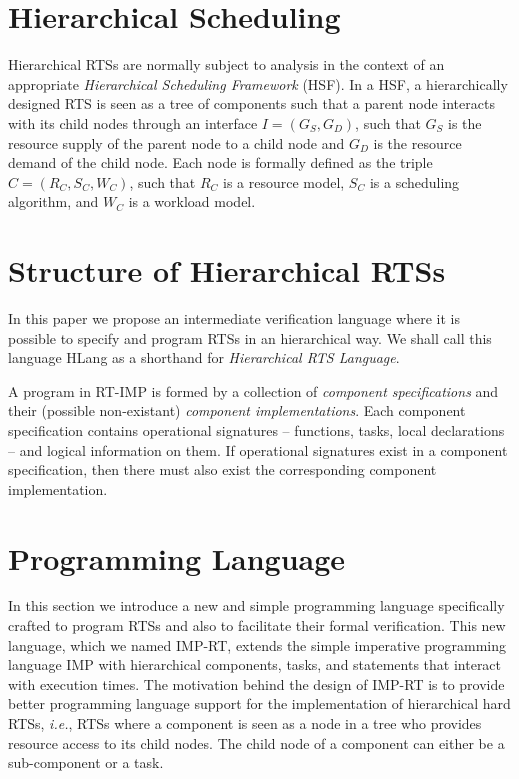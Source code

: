 \documentclass{llncs}
\begin{document}
\section{Hierarchical Scheduling}

Hierarchical RTSs are normally subject to analysis in the context of an appropriate {\em Hierarchical Scheduling Framework} (HSF). In a HSF, a hierarchically designed RTS is seen as a tree of components such that a parent node interacts with its child nodes through an interface $I = (G_S,G_D)$, such that $G_S$ is the resource supply of the parent node to a child node and $G_D$ is the resource demand of the child node. Each node is formally defined as the triple $C = (R_C,S_C,W_C)$, such that $R_C$ is a resource model, $S_C$ is a scheduling algorithm, and $W_C$ is a workload model.

\section{Structure of Hierarchical RTSs}

In this paper we propose an intermediate verification language where it is possible to specify and program RTSs in an hierarchical way. We shall call this language {\sf HLang} as a shorthand for {\em Hierarchical RTS Language}.

A program in RT-IMP is formed by a collection of {\em component specifications} and their (possible non-existant) {\em component implementations}. Each component specification contains operational signatures -- functions, tasks, local declarations -- and logical information on them. If operational signatures exist in a component specification, then there must also exist the corresponding component implementation. 

\section{Programming Language}

In this section we introduce a new and simple programming language specifically crafted to program RTSs and also to facilitate their formal verification. This new language, which we named IMP-RT, extends the simple imperative programming language IMP \cite{} with hierarchical components, tasks, and statements that interact with execution times.
The motivation behind the design of IMP-RT is to provide better programming language support for the implementation of hierarchical hard RTSs, {\sl i.e.}, RTSs where a component is seen as a node in a tree who provides resource access to its child nodes. The child node of a component can either be a sub-component or a task. 
\end{document}

